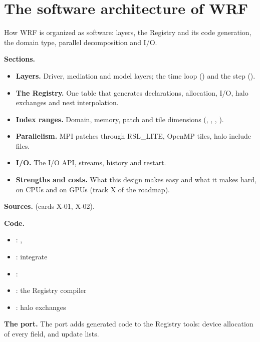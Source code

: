 \chapter{The software architecture of WRF}\label{ch:arch}

How WRF is organized as software: layers, the Registry and its code generation, the domain type, parallel decomposition and I/O.

\begin{outline}[(card B-14)]
\textbf{Sections.}
\begin{itemize}
    \item \textbf{Layers.} Driver, mediation and model layers; the time loop () and the step ().
    \item \textbf{The Registry.} One table that generates declarations, allocation, I/O, halo exchanges and nest interpolation.
    \item \textbf{Index ranges.} Domain, memory, patch and tile dimensions (, , , ).
    \item \textbf{Parallelism.} MPI patches through RSL\_LITE, OpenMP tiles, halo include files.
    \item \textbf{I/O.} The I/O API, streams, history and restart.
    \item \textbf{Strengths and costs.} What this design makes easy and what it makes hard, on CPUs and on GPUs (track X of the roadmap).
\end{itemize}
\textbf{Sources.}  (cards X-01, X-02).

\textbf{Code.}
\begin{itemize}
    \item {}: , 
    \item {}: integrate
    \item {}: 
    \item {}: the Registry compiler
    \item {}: halo exchanges
\end{itemize}
\textbf{The port.} The port adds generated code to the Registry tools: device allocation of every field, and update lists.
\end{outline}
